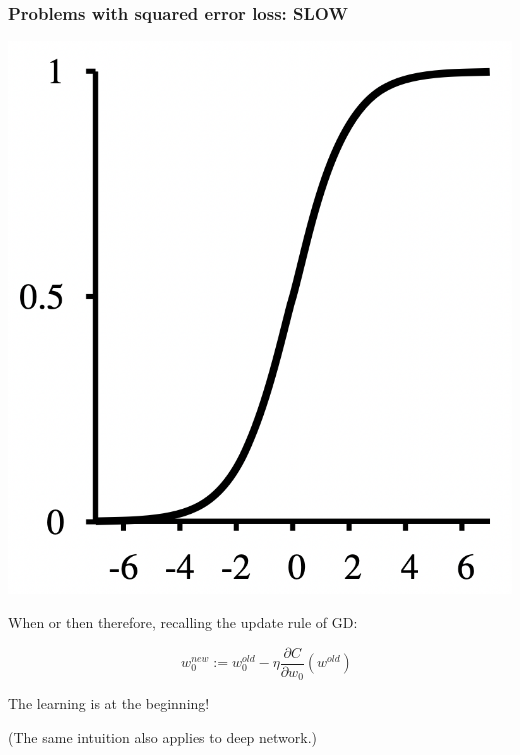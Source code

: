 \documentclass[usenames,dvipsnames]{beamer}
\begin{document}

\begin{frame}
  \frametitle{Problems with squared error loss: SLOW}
  
  \begin{center}
  \includegraphics[scale=.2]{sigmoid}	
  \end{center}

When  or  then  therefore, recalling the update rule of GD: 
  
  \[\quad w_0^{new} := w_0^{old} - \eta \frac{\partial C}{\partial w_0} (w^{old})\] 
  
  \pause
 
\begin{alertblock}{}
\centering
The learning is  at the beginning!
\end{alertblock}

(The same intuition also applies to deep network.)

\end{frame}


\end{document}
